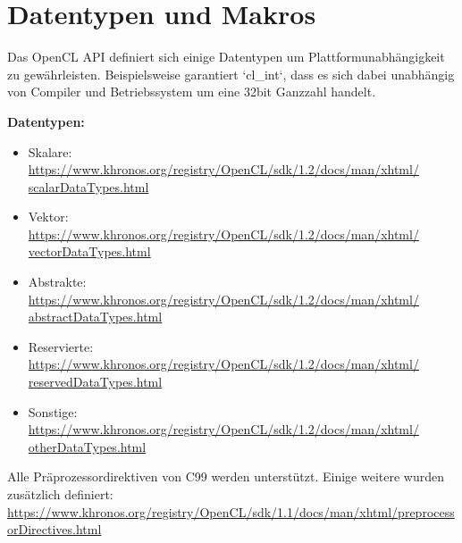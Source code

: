 		\section{Datentypen und Makros}\label{makros}
		Das OpenCL \Gls{API} definiert sich einige Datentypen um Plattformunabhängigkeit zu gewährleisten. Beispielsweise garantiert \li`cl_int`, dass es sich dabei unabhängig von Compiler und Betriebssystem um eine 32bit Ganzzahl handelt.
		
		\textbf{Datentypen:}		
		
		\begin{itemize}
			\item Skalare:\\ \href{https://www.khronos.org/registry/OpenCL/sdk/1.2/docs/man/xhtml/scalarDataTypes.html}
			{https://www.khronos.org/registry/OpenCL/sdk/1.2/docs/man/xhtml/\\scalarDataTypes.html}
			\item Vektor:\\ \href{https://www.khronos.org/registry/OpenCL/sdk/1.2/docs/man/xhtml/vectorDataTypes.html}
			{https://www.khronos.org/registry/OpenCL/sdk/1.2/docs/man/xhtml/\\vectorDataTypes.html}
			\item Abstrakte:\\ \href{https://www.khronos.org/registry/OpenCL/sdk/1.2/docs/man/xhtml/abstractDataTypes.html}
			{https://www.khronos.org/registry/OpenCL/sdk/1.2/docs/man/xhtml/\\abstractDataTypes.html}
			\item Reservierte:\\ \href{https://www.khronos.org/registry/OpenCL/sdk/1.2/docs/man/xhtml/reservedDataTypes.html}
			{https://www.khronos.org/registry/OpenCL/sdk/1.2/docs/man/xhtml/\\reservedDataTypes.html}
			\item Sonstige:\\ \href{https://www.khronos.org/registry/OpenCL/sdk/1.2/docs/man/xhtml/otherDataTypes.html}
			{https://www.khronos.org/registry/OpenCL/sdk/1.2/docs/man/xhtml/\\otherDataTypes.html}
		\end{itemize}		
		
		Alle Präprozessordirektiven von C99 werden unterstützt. Einige weitere wurden zusätzlich definiert:\\ \href{https://www.khronos.org/registry/OpenCL/sdk/1.1/docs/man/xhtml/preprocessorDirectives.html}{\small https://www.khronos.org/registry/OpenCL/sdk/1.1/docs/man/xhtml/preprocessorDirectives.html}		
		
